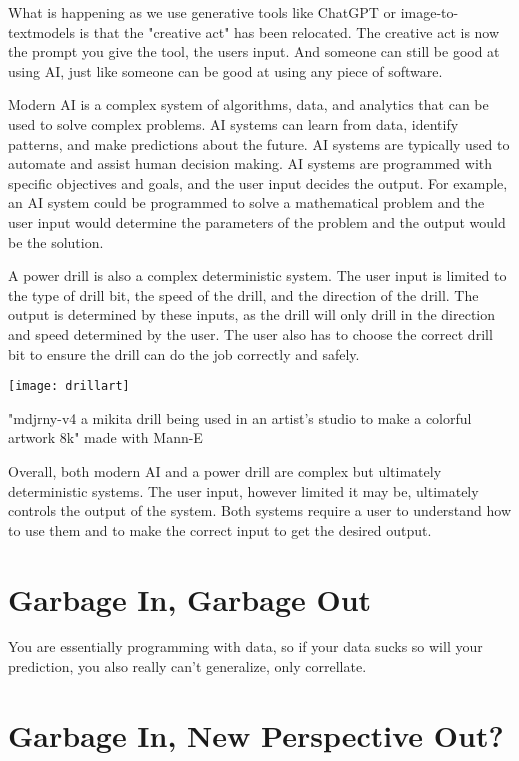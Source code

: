 What is happening as we use generative tools like ChatGPT or image-to-textmodels is that the "creative act" has been relocated. The creative act is now the prompt you give the tool, the users input. And someone can still be good at using AI, just like someone can be good at using any piece of software.

Modern AI is a complex system of algorithms, data, and analytics that can be used to solve complex problems. AI systems can learn from data, identify patterns, and make predictions about the future. AI systems are typically used to automate and assist human decision making. AI systems are programmed with specific objectives and goals, and the user input decides the output. For example, an AI system could be programmed to solve a mathematical problem and the user input would determine the parameters of the problem and the output would be the solution.

A power drill is also a complex deterministic system. The user input is limited to the type of drill bit, the speed of the drill, and the direction of the drill. The output is determined by these inputs, as the drill will only drill in the direction and speed determined by the user. The user also has to choose the correct drill bit to ensure the drill can do the job correctly and safely.

\begin{marginfigure}[-5.5cm]
        \texttt{[image: drillart]}
        \caption{"mdjrny-v4 a mikita drill being used in an artist's studio to make a colorful artwork 8k" made with Mann-E}
\end{marginfigure}

Overall, both modern AI and a power drill are complex but ultimately deterministic systems. The user input, however limited it may be, ultimately controls the output of the system. Both systems require a user to understand how to use them and to make the correct input to get the desired output.

\section{Garbage In, Garbage Out}

You are essentially programming with data, so if your data sucks so will your prediction, you also really can't generalize, only correllate.

\section{Garbage In, New Perspective Out?}

